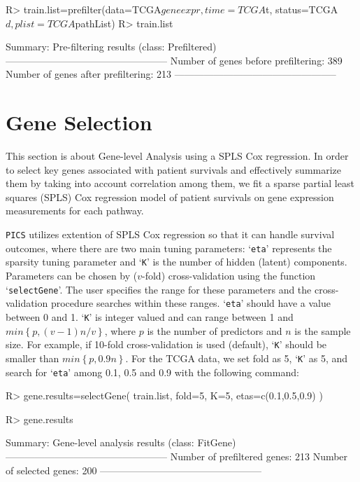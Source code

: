 \documentclass[11pt]{article}
\begin{document}
\begin{Schunk}
\begin{Sinput}
R> train.list=prefilter(data=TCGA$geneexpr, time=TCGA$t, status=TCGA$d, plist=TCGA$pathList)
R> train.list
\end{Sinput}
\begin{Soutput}
Summary: Pre-filtering results (class: Prefiltered)
--------------------------------------------------
Number of genes before prefiltering: 389
Number of genes after prefiltering: 213
--------------------------------------------------
\end{Soutput}
\end{Schunk}

\section{Gene Selection}
This section is about Gene-level Analysis using a SPLS\cite{SPLS} Cox regression. In order to select key genes associated with patient survivals and effectively summarize them by taking into account correlation among them, we fit a sparse partial least squares (SPLS) Cox regression model of patient survivals on gene expression measurements for each pathway.

\texttt{PICS} utilizes extention of SPLS Cox regression so that it can handle survival outcomes, where there are two main tuning parameters: `\texttt{eta}' represents
the sparsity tuning parameter and `\texttt{K}'
is the number of hidden (latent) components. Parameters can be chosen by ($v$-fold)
cross-validation using the
function `\texttt{selectGene}'.  The user specifies the range for these parameters and
the cross-validation procedure
searches within these ranges. `\texttt{eta}' should have a value between 0 and 1. `\texttt{K}'
is integer valued and can range between
1 and $ min \left\{ p, (v-1) n / v \right\} $, where $p$ is the number of predictors and $n$ is the sample size. For example, if 10-fold cross-validation is used (default), `\texttt{K}' should be smaller than $ min \left\{ p, 0.9 n \right\} $. For the TCGA data, we set fold as 5, `\texttt{K}' as 5, and search for `\texttt{eta}' among 0.1, 0.5 and 0.9
with the following command:


\begin{Schunk}
\begin{Sinput}
R> gene.results=selectGene( train.list, fold=5, K=5, etas=c(0.1,0.5,0.9) )
\end{Sinput}
\end{Schunk}
\begin{Schunk}
\begin{Sinput}
R> gene.results
\end{Sinput}
\begin{Soutput}
Summary: Gene-level analysis results (class: FitGene)
--------------------------------------------------
Number of prefiltered genes: 213
Number of selected genes: 200
--------------------------------------------------
\end{Soutput}
\end{Schunk}
\end{document}
